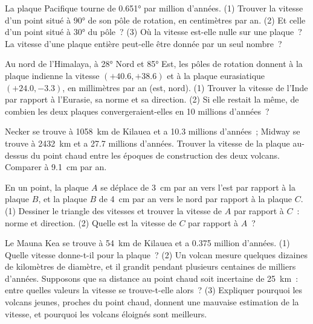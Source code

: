 \begin{exercise}[$\star\star$]\label{exo:g11:plate-motions:8}
La plaque Pacifique tourne de \ang{0.651} par million d'années. (1) Trouver
la vitesse d'un point situé à \ang{90} de son pôle de rotation, en
centimètres par an. (2) Et celle d'un point situé à \ang{30} du pôle~?
(3) Où la vitesse est-elle nulle sur une plaque~? La vitesse d'une plaque
entière peut-elle être donnée par un seul nombre~?
\end{exercise}

\begin{exercise}[$\star\star$]\label{exo:g11:plate-motions:9}
Au nord de l'Himalaya, à \ang{28} Nord et \ang{85} Est, les pôles de
rotation donnent à la plaque indienne la vitesse $(+40.6, +38.6)$ et à la
plaque eurasiatique $(+24.0, -3.3)$, en millimètres par an (est, nord).
(1) Trouver la vitesse de l'Inde par rapport à l'Eurasie, sa norme et sa
direction. (2) Si elle restait la même, de combien les deux plaques
convergeraient-elles en 10 millions d'années~?
\end{exercise}

\begin{exercise}[$\star\star$]\label{exo:g11:plate-motions:10}
Necker se trouve à \qty{1058}{km} de Kilauea et a \num{10.3} millions
d'années~; Midway se trouve à \qty{2432}{km} et a \num{27.7} millions
d'années. Trouver la vitesse de la plaque au-dessus du point chaud entre les
époques de construction des deux volcans. Comparer à \qty{9.1}{cm} par an.
\end{exercise}

\begin{exercise}[$\star\star$]\label{exo:g11:plate-motions:11}
En un point, la plaque $A$ se déplace de \qty{3}{cm} par an vers l'est par
rapport à la plaque $B$, et la plaque $B$ de \qty{4}{cm} par an vers le nord
par rapport à la plaque $C$. (1) Dessiner le triangle des vitesses et
trouver la vitesse de $A$ par rapport à $C$~: norme et direction. (2) Quelle
est la vitesse de $C$ par rapport à $A$~?
\end{exercise}

\begin{exercise}[$\star\star\star$]\label{exo:g11:plate-motions:12}
Le Mauna Kea se trouve à \qty{54}{km} de Kilauea et a \num{0.375} million
d'années. (1) Quelle vitesse donne-t-il pour la plaque~? (2) Un volcan
mesure quelques dizaines de kilomètres de diamètre, et il grandit pendant
plusieurs centaines de milliers d'années. Supposons que sa distance au point
chaud soit incertaine de \qty{25}{km}~: entre quelles valeurs la vitesse
se trouve-t-elle alors~? (3) Expliquer pourquoi les volcans jeunes, proches
du point chaud, donnent une mauvaise estimation de la vitesse, et pourquoi
les volcans éloignés sont meilleurs.
\end{exercise}

